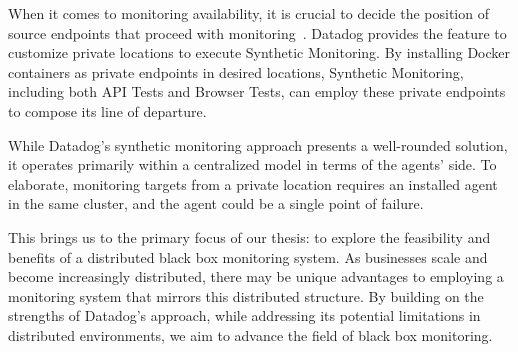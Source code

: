 When it comes to monitoring availability, it is crucial to decide the position of source endpoints that proceed with monitoring~\parencite{datadogRunSyntheticTests}. Datadog provides the feature to customize private locations to execute Synthetic Monitoring. By installing Docker containers as private endpoints in desired locations, Synthetic Monitoring, including both API Tests and Browser Tests, can employ these private endpoints to compose its line of departure. 

While Datadog's synthetic monitoring approach presents a well-rounded solution, it operates primarily within a centralized model in terms of the agents' side. To elaborate, monitoring targets from a private location requires an installed agent in the same cluster, and the agent could be a single point of failure. 

This brings us to the primary focus of our thesis: to explore the feasibility and benefits of a distributed black box monitoring system. As businesses scale and become increasingly distributed, there may be unique advantages to employing a monitoring system that mirrors this distributed structure. By building on the strengths of Datadog's approach, while addressing its potential limitations in distributed environments, we aim to advance the field of black box monitoring. 